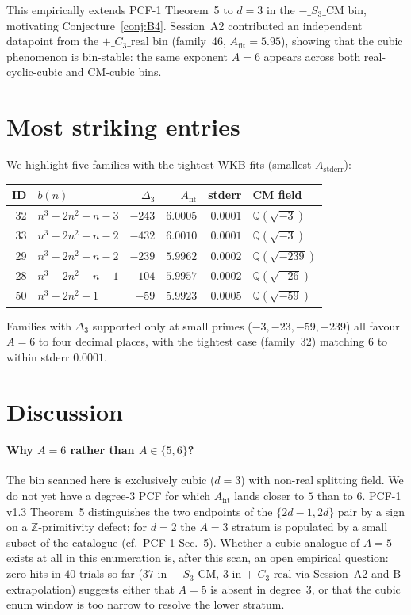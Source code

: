\documentclass[11pt,reqno]{amsart}
\theoremstyle{definition}
\newcommand{\Q}{\mathbb{Q}}
\newcommand{\Z}{\mathbb{Z}}
\begin{document}
This empirically extends PCF-1 Theorem~5 to $d=3$ in the
$-\_S_3\_\mathrm{CM}$ bin, motivating Conjecture~\ref{conj:B4}.
Session~A2 contributed an independent datapoint from the
$+\_C_3\_\mathrm{real}$ bin (family~46, $A_{\mathrm{fit}} = 5.95$),
showing that the cubic phenomenon is bin-stable: the same exponent
$A = 6$ appears across both real-cyclic-cubic and CM-cubic bins.

\section{Most striking entries}\label{sec:striking}

We highlight five families with the tightest WKB fits
(smallest $A_{\mathrm{stderr}}$):
\begin{center}
\begin{tabular}{rlrrrl}
\toprule
ID & $b(n)$ & $\Delta_3$ & $A_{\mathrm{fit}}$ & stderr & CM field \\
\midrule
32 & $n^3-2n^2+n-3$ & $-243$ & $6.0005$ & $0.0001$ & $\Q(\sqrt{-3})$ \\
33 & $n^3-2n^2+n-2$ & $-432$ & $6.0010$ & $0.0001$ & $\Q(\sqrt{-3})$ \\
29 & $n^3-2n^2-n-2$ & $-239$ & $5.9962$ & $0.0002$ & $\Q(\sqrt{-239})$ \\
28 & $n^3-2n^2-n-1$ & $-104$ & $5.9957$ & $0.0002$ & $\Q(\sqrt{-26})$ \\
50 & $n^3-2n^2-1$ & $-59$ & $5.9923$ & $0.0005$ & $\Q(\sqrt{-59})$ \\
\bottomrule
\end{tabular}
\end{center}

\noindent
Families with $\Delta_3$ supported only at small primes ($-3, -23, -59,
-239$) all favour $A = 6$ to four decimal places, with the tightest
case (family~32) matching $6$ to within stderr $0.0001$.

\section{Discussion}\label{sec:discuss}

\paragraph{Why $A=6$ rather than $A\in\{5,6\}$?}
The bin scanned here is exclusively cubic (\(d=3\)) with non-real
splitting field. We do not yet have a degree-$3$ PCF for which
$A_{\mathrm{fit}}$ lands closer to $5$ than to $6$. PCF-1 v1.3
Theorem~5 distinguishes the two endpoints of the $\{2d-1, 2d\}$ pair by
a sign on a $\Z$-primitivity defect; for $d=2$ the $A=3$ stratum is
populated by a small subset of the catalogue (cf.~PCF-1 Sec.~5).
Whether a cubic analogue of $A = 5$ exists at all in this enumeration
is, after this scan, an open empirical question: zero hits in $40$
trials so far ($37$ in $-\_S_3\_\mathrm{CM}$, $3$ in
$+\_C_3\_\mathrm{real}$ via Session~A2 and B-extrapolation) suggests
either that $A = 5$ is absent in degree~$3$, or that the cubic enum
window is too narrow to resolve the lower stratum.
\end{document}
